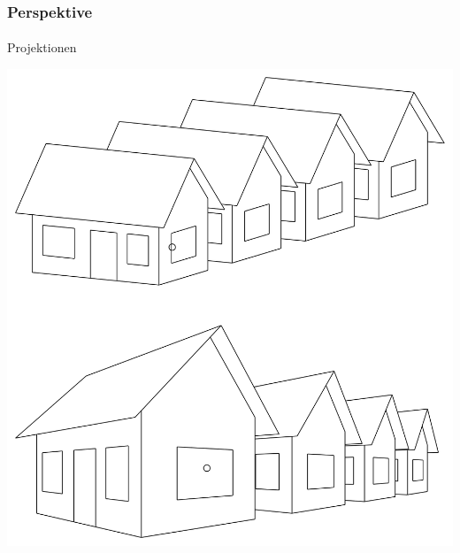 \documentclass{beamer}
\begin{document}
\begin{frame}
    \frametitle{Perspektive}
\framesubtitle{}
    \begin{block}{Projektionen}
\begin{center}
\includegraphics[scale=0.15]{images/projs}
\end{center}
\end{block}

\end{frame}
\end{document}
